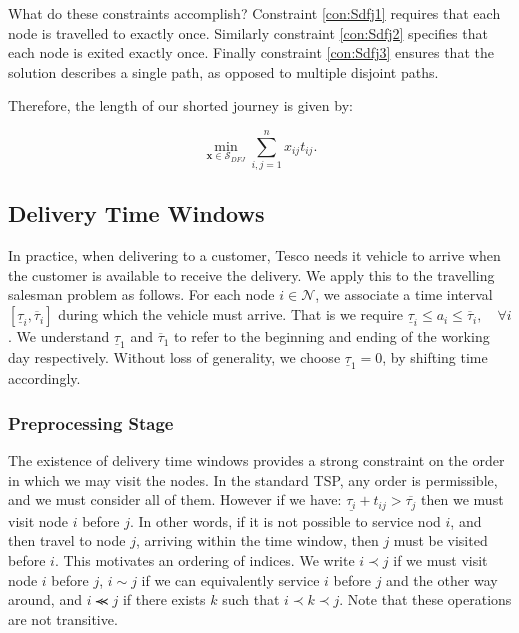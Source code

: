 What do these constraints accomplish? Constraint \ref{con:Sdfj1} requires that each node is travelled to exactly once. Similarly constraint \ref{con:Sdfj2} specifies that each node is exited exactly once. Finally constraint \ref{con:Sdfj3} ensures that the solution describes a single path, as opposed to multiple disjoint paths. 

Therefore, the length of our shorted journey is given by:

\begin{equation}
\label{def:tsp_obj}
\min \limits_{\mathbf{x} \in \mathcal{S}_{DFJ}} \sum \limits_{i,j = 1}^{n} x_{ij}t_{ij} .
\end{equation}


\subsection{Delivery Time Windows}
\label{sec:DW}

In practice, when delivering to a customer, Tesco needs it vehicle to arrive when the customer is available to receive the delivery.  We apply this to the travelling salesman problem as follows. For each node $i \in \mathcal{N}$, we associate a time interval $[\underline{\tau}_i, \overline{\tau}_i]$ during which the vehicle must arrive. That is we require $\underline{\tau}_i \leq a_i \leq \overline{\tau}_i, \quad \forall i$. We understand $\underline{\tau}_1$ and $\overline{\tau}_1$ to refer to the beginning and ending of the working day respectively. Without loss of generality, we choose $\underline{\tau}_1 = 0$, by shifting time accordingly.

\subsubsection{Preprocessing Stage}
\label{sec:DWPreprocess}
The existence of delivery time windows provides a strong constraint on the order in which we may visit the nodes. In the standard TSP, any order is permissible, and we must consider all of them. However if we have: $\underline{\tau_i}+t_{ij} > \overline{\tau_j}$ then we must visit node $i$ before $j$. In other words, if it is not possible to service nod $i$, and then travel to node $j$, arriving within the time window, then $j$ must be visited before $i$. This motivates an ordering of indices. We write $i  \prec j$ if we must visit node $i$ before $j$, $i \sim j$ if we can equivalently service $i$ before $j$ and the other way around, and $i \llcurly j$ if there exists $k$ such that $i \prec k \prec j$. Note that these operations are not transitive.

